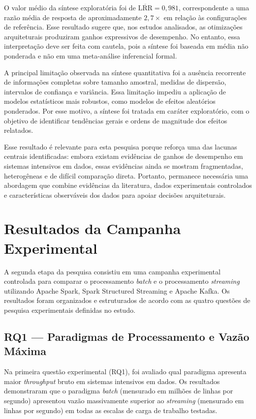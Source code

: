 O valor médio da síntese exploratória foi de $\overline{\text{LRR}} = 0{,}981$, correspondente a uma razão média de resposta de aproximadamente $2{,}7\times$ em relação às configurações de referência. Esse resultado sugere que, nos estudos analisados, as otimizações arquiteturais produziram ganhos expressivos de desempenho. No entanto, essa interpretação deve ser feita com cautela, pois a síntese foi baseada em média não ponderada e não em uma meta-análise inferencial formal.

A principal limitação observada na síntese quantitativa foi a ausência recorrente de informações completas sobre tamanho amostral, medidas de dispersão, intervalos de confiança e variância. Essa limitação impediu a aplicação de modelos estatísticos mais robustos, como modelos de efeitos aleatórios ponderados. Por esse motivo, a síntese foi tratada em caráter exploratório, com o objetivo de identificar tendências gerais e ordens de magnitude dos efeitos relatados.

Esse resultado é relevante para esta pesquisa porque reforça uma das lacunas centrais identificadas: embora existam evidências de ganhos de desempenho em sistemas intensivos em dados, essas evidências ainda se mostram fragmentadas, heterogêneas e de difícil comparação direta. Portanto, permanece necessária uma abordagem que combine evidências da literatura, dados experimentais controlados e características observáveis dos dados para apoiar decisões arquiteturais.

\section{Resultados da Campanha Experimental}
\label{sec:resultados-experimento}

A segunda etapa da pesquisa consistiu em uma campanha experimental controlada para comparar o processamento \textit{batch} e o processamento \textit{streaming} utilizando Apache Spark, Spark Structured Streaming e Apache Kafka. Os resultados foram organizados e estruturados de acordo com as quatro questões de pesquisa experimentais definidas no estudo.

\subsection{RQ1 --- Paradigmas de Processamento e Vazão Máxima}
Na primeira questão experimental (RQ1), foi avaliado qual paradigma apresenta maior \textit{throughput} bruto em sistemas intensivos em dados. Os resultados demonstraram que o paradigma \textit{batch} (mensurado em milhões de linhas por segundo) apresentou vazão massivamente superior ao \textit{streaming} (mensurado em linhas por segundo) em todas as escalas de carga de trabalho testadas. 

